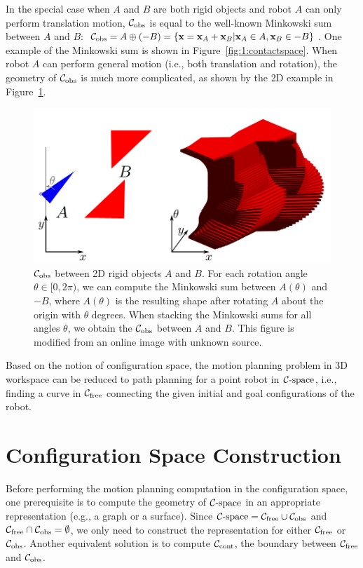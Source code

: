 In the special case when $A$ and $B$ are both rigid objects and robot $A$ can only perform translation motion, $\Cobs$ is equal to the well-known Minkowski sum between $A$ and $B$: $\mathcal C_{\text{obs}} = A \oplus (-B) = \{\mathbf x = \mathbf x_A + \mathbf x_B | \mathbf x_A \in A, \mathbf x_B \in -B \}$. One example of the Minkowski sum is shown in Figure~\ref{fig:1:contactspace}. When robot $A$ can perform general motion (i.e., both translation and rotation), the geometry of $\Cobs$ is much more complicated, as shown by the 2D example in Figure~\ref{fig:1:cspaceSE2}.

\begin{figure}[htb]
  \centering
  \includegraphics[width=0.9\linewidth]{figs/1/cspaceSE2.png}
  \caption[$\Cobs$ between 2D rigid objects $A$ and $B$]{$\Cobs$ between 2D rigid objects $A$ and $B$. For each rotation angle $\theta \in [0, 2\pi)$, we can compute the Minkowski sum between $A(\theta)$ and $-B$, where $A(\theta)$ is the resulting shape after rotating $A$ about the origin with $\theta$ degrees. When stacking the Minkowski sums for all angles $\theta$, we obtain the $\Cobs$ between $A$ and $B$. This figure is modified from an online image with unknown source.}
  \label{fig:1:cspaceSE2}
\end{figure}

Based on the notion of configuration space, the motion planning problem in 3D workspace can be reduced to path planning for a point robot in $\mathcal C\text{-space}$, i.e., finding a curve in $\mathcal C_{\text{free}}$ connecting the given initial and goal configurations of the robot.

\section{Configuration Space Construction}
\label{sec:1:configconstruction}
Before performing the motion planning computation in the configuration space, one prerequisite is to compute the geometry of $\mathcal C\text{-space}$ in an appropriate representation (e.g., a graph or a surface). Since $\mathcal C\text{-space} = \mathcal C_{\text{free}} \cup \mathcal C_{\text{obs}}$ and $\mathcal C_{\text{free}} \cap \mathcal C_{\text{obs}} = \emptyset$, we only need to construct the representation for either $\mathcal C_{\text{free}}$ or $\Cobs$. Another equivalent solution is to compute $\mathcal C_\text{cont}$, the boundary between $\mathcal C_{\text{free}}$ and $\Cobs$.

